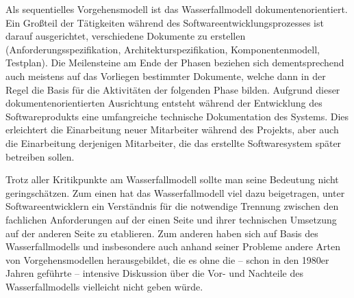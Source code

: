 
Als sequentielles Vorgehensmodell ist das Wasserfallmodell dokumentenorientiert. Ein Großteil der Tätigkeiten während des Softwareentwicklungsprozesses ist darauf ausgerichtet, verschiedene Dokumente
zu erstellen (\zb Anforderungsspezifikation, Architekturspezifikation, Komponentenmodell, Testplan). Die Meilensteine am Ende der Phasen beziehen sich dementsprechend auch meistens auf das Vorliegen bestimmter Dokumente, welche dann in der Regel die Basis für die Aktivitäten der folgenden Phase bilden. Aufgrund dieser dokumentenorientierten Ausrichtung entsteht während der Entwicklung des Softwareprodukts eine umfangreiche technische Dokumentation des Systems. Dies erleichtert die Einarbeitung neuer Mitarbeiter während des Projekts, aber auch die Einarbeitung derjenigen Mitarbeiter, die das erstellte Softwaresystem später betreiben sollen.

\vspace{2mm} %


Trotz aller Kritikpunkte am Wasserfallmodell sollte man seine Bedeutung nicht geringschätzen. Zum einen hat das Wasserfallmodell viel dazu beigetragen, unter Softwareentwicklern ein Verständnis für die notwendige Trennung zwischen den fachlichen Anforderungen auf der einen Seite und ihrer technischen Umsetzung auf der anderen Seite zu etablieren. Zum anderen haben sich auf Basis des Wasserfallmodells und insbesondere auch anhand seiner Probleme andere Arten von Vorgehensmodellen herausgebildet, die es ohne die – schon in den 1980er Jahren geführte – intensive Diskussion über die Vor- und Nachteile des Wasserfallmodells vielleicht nicht geben würde.

